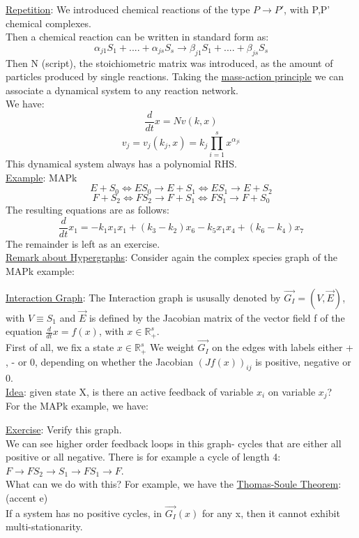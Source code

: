 \documentclass[11pt]{article}
\begin{document}
\underline{Repetition}: We introduced chemical reactions of the type $P \rightarrow P'$, with P,P' chemical complexes.\\
Then a chemical reaction can be written in standard form as: $$\alpha_{j1}S_{1}+....+ \alpha_{js}S_{s} \rightarrow \beta_{j1}S_{1}+....+\beta_{js}S_{s}$$
Then N (script), the stoichiometric matrix was introduced, as the amount of particles produced by single reactions. Taking the \underline{mass-action principle} we can associate a dynamical system to any reaction network.\\

We have: $$\frac{d}{dt}x = Nv(k,x)$$ $$v_{j} = v_{j}(k_{j},x) = k_{j}\prod_{i=1}^{s} x^{\alpha_{ji}}$$
This dynamical system always has a polynomial RHS.\\

\underline{Example}: MAPk\\
$$E+S_{0} 	\Leftrightarrow ES_{0} \rightarrow E+S_{1} \Leftrightarrow ES_{1} \rightarrow E+S_{2}$$
$$F+S_{2} \Leftrightarrow FS_{2} \rightarrow F+S_{1} \Leftrightarrow FS_{1} \rightarrow F+S_{0}$$
The resulting equations are as follows: $$
\frac{d}{dt}x_{1} = -k_{1}x_{1}x_{1} + (k_{3}-k_{2})x_{6} -k_{5}x_{1}x_{4}+(k_{6}-k_{4})x_{7}
$$ The remainder is left as an exercise.\\

\underline{Remark about Hypergraphs}: Consider again the complex species graph of the MAPk example:

\vspace{5 cm}

\underline{Interaction Graph}: The Interaction graph is ususally denoted by $\stackrel{\rightarrow}{G_{I}} = (V,\stackrel{\rightarrow}{E})$, with $V \equiv S_{1}$ and  $\stackrel{\rightarrow}{E}$ is defined by the Jacobian matrix of the vector field f of the equation $\frac{d}{dt} x = f(x)$, with $x \in \mathbb{R}_{+}^{s}$.\\

First of all, we fix a state $x \in \mathbb{R}_{+}^{s}$ We weight $\stackrel{\rightarrow}{G_{I}}$ on the edges with labels either + , - or 0, depending on whether the Jacobian $(Jf(x))_{ij}$ is positive, negative or 0.\\

\underline{Idea}: given state X, is there an active feedback of variable $x_{i}$ on variable $x_{j}$?\\

For the MAPk example, we have:

\vspace{5 cm}

\underline{Exercise}: Verify this graph.\\ 

We can see higher order feedback loops in this graph- cycles that are either all positive or all negative. There is for example a cycle of length 4: $F\rightarrow FS_{2} \rightarrow S_{1} \rightarrow FS_{1} \rightarrow F$.\\

What can we do with this? For example, we have the \underline{Thomas-Soule Theorem}: (accent e)\\
If a system has no positive cycles, in $\stackrel{\rightarrow}{G_{I}}(x)$ for any x, then it cannot exhibit multi-stationarity.
\end{document}
